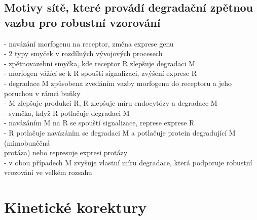 \documentclass[11pt,a4paper]{report}
\begin{document}
\section{Motivy sítě, které provádí degradační zpětnou vazbu pro robustní vzorování}
- navázání morfogenu na receptor, změna exprese genu\\
\indent - 2 typy smyček v rozdílných vývojových procesech\\
- zpětnovazební smyčka, kde receptor R zlepšuje degradaci M\\
\indent - morfogen vážící se k R spouští signalizaci, zvýšení exprese R\\
\indent - degradace M způsobena zvedáním vazby morfogenu do receptoru a jeho poruchou v rámci buňky\\
\indent - M zlepšuje produkci R, R zlepšuje míru endocytózy a degradace M\\
- symčka, když R potlačuje degradaci M\\
\indent - navázáním M na R se spouští signalizace, represe exprese R\\
\indent - R potlačuje navázáním se degradaci M a potlačuje protein degradující M (mimobuněčná\\
\indent \indent protáza) nebo represuje expresi protázy\\
- v obou případech M zvyšuje vlastní míru degradace, která podporuje robustní vrozování ve velkém rozsahu\\


\chapter{Kinetické korektury}
\end{document}
